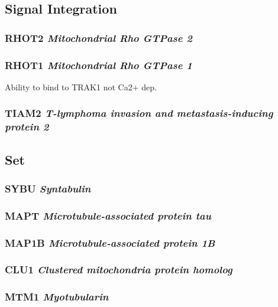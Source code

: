 \subsection{Signal Integration}

\subsubsection{RHOT2 \textit{Mitochondrial Rho GTPase 2}}

\subsubsection{RHOT1 \textit{Mitochondrial Rho GTPase 1}}

Ability to bind to TRAK1 not Ca2+ dep.

\subsubsection{TIAM2 \textit{T-lymphoma invasion and metastasis-inducing protein 2}}

\subsection{Set}

\subsubsection{SYBU \textit{Syntabulin}}

\subsubsection{MAPT \textit{Microtubule-associated protein tau}}

\subsubsection{MAP1B \textit{Microtubule-associated protein 1B}}

\subsubsection{CLU1 \textit{Clustered mitochondria protein homolog}}

\subsubsection{MTM1 \textit{Myotubularin}}

